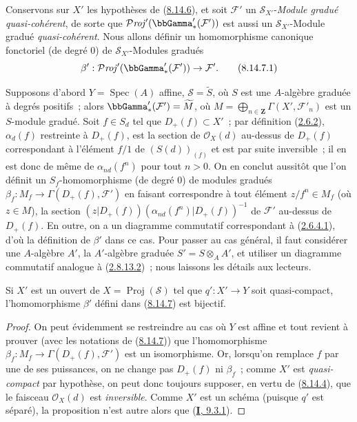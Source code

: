 \begin{env}[8.14.7]
\label{II.8.14.7-fr}
Conservons sur $X'$ les hypothèses de
(\hyperref[II.8.14.6-fr]{8.14.6}), et soit $\mathcal{F}'$ un
$\mathcal{S}_{X'}$-\emph{Module gradué quasi-cohérent}, de sorte que
$\mathcal{P}\mathit{roj}'(\bbGamma'_*(\mathcal{F}'))$ est aussi un
$\mathcal{S}_{X'}$-Module gradué \emph{quasi-cohérent}. Nous allons définir un
homomorphisme canonique fonctoriel (de degré $0$) de
$\mathcal{S}_{X'}$-Modules gradués
\begin{equation}
\label{II.8.14.7.1-fr}
  \beta':\mathcal{P}\mathit{roj}'(\bbGamma'_*(\mathcal{F}'))\to\mathcal{F}'.
\tag{8.14.7.1}
\end{equation}

Supposons d'abord $Y=\operatorname{Spec}(A)$ affine,
$\mathcal{S}=\widetilde{S}$, où $S$ est une $A$-algèbre graduée à degrés
positifs~; alors $\bbGamma'_*(\mathcal{F}')=\widetilde{M}$, où
$M=\bigoplus_{n\in\mathbf{Z}}\Gamma(X',\mathcal{F}'_n)$ est un $S$-module
gradué. Soit $f\in S_d$ tel que $D_+(f)\subset X'$~; par définition
(\hyperref[II.2.6.2-fr]{2.6.2}), $\alpha_d(f)$ restreinte à $D_+(f)$, est la
section de $\mathcal{O}_X(d)$ au-dessus de $D_+(f)$ correspondant à
l'élément $f/1$ de $(S(d))_{(f)}$ et est par suite inversible~; il en est donc
de même de $\alpha_{nd}(f^n)$ pour tout $n>0$. On en conclut aussitôt que
l'on définit un $S_f$-homomorphisme (de degré $0$) de modules gradués
$\beta_f:M_f\to\Gamma(D_+(f),\mathcal{F}')$ en faisant correspondre à tout
élément $z/f^n\in M_f$ (où $z\in M$), la section
$(z|D_+(f))(\alpha_{nd}(f^n)|D_+(f))^{-1}$ de $\mathcal{F}'$ au-dessus de
$D_+(f)$. En outre, on a un diagramme commutatif correspondant à
(\hyperref[II.2.6.4.1-fr]{2.6.4.1}), d'où la définition de $\beta'$ dans ce
cas. Pour passer au cas général, il faut considérer une $A$-algèbre $A'$,
la $A'$-algèbre graduée $S'=S\otimes_A A'$, et utiliser un diagramme
commutatif analogue à (\hyperref[II.2.8.13.2-fr]{2.8.13.2})~; nous laissons
les détails aux lecteurs.
\end{env}

\begin{proposition}[8.14.8]
\label{II.8.14.8-fr}
Si $X'$ est un ouvert de $X=\operatorname{Proj}(\mathcal{S})$ tel que
$q':X'\to Y$ soit quasi-compact, l'homomorphisme $\beta'$ défini dans
\textup{(\hyperref[II.8.14.7-fr]{8.14.7})} est bijectif.
\end{proposition}

\begin{proof}
On peut évidemment se restreindre au cas où $Y$ est affine et tout revient à
prouver (avec les notations de (\hyperref[II.8.14.7-fr]{8.14.7})) que
l'homomorphisme $\beta_f:M_f\to\Gamma(D_+(f),\mathcal{F}')$ est un
isomorphisme. Or, lorsqu'on remplace $f$ par une de ses puissances, on ne
change pas $D_+(f)$ ni $\beta_f$~; comme $X'$ est \emph{quasi-compact} par
hypothèse, on peut donc toujours supposer, en vertu de
(\hyperref[II.8.14.4-fr]{8.14.4}), que le faisceau $\mathcal{O}_X(d)$ est
\emph{inversible}. Comme $X'$ est un schéma (puisque $q'$ est séparé), la
proposition n'est autre alors que (\hyperref[I.9.3.1-fr]{\textbf{I}, 9.3.1}).
\end{proof}

